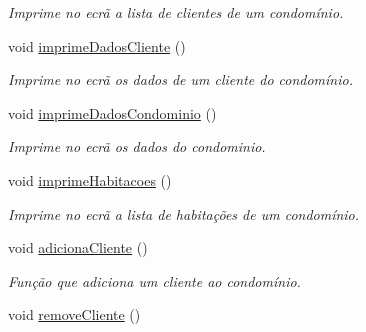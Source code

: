 \begin{DoxyCompactItemize}
\begin{DoxyCompactList}\small\item\em Imprime no ecrã a lista de clientes de um condomínio. \end{DoxyCompactList}\item 
void \hyperlink{class_interface_ad534a51f3ad3d4127764dfeb8ec6889c}{imprime\+Dados\+Cliente} ()\hypertarget{class_interface_ad534a51f3ad3d4127764dfeb8ec6889c}{}\label{class_interface_ad534a51f3ad3d4127764dfeb8ec6889c}

\begin{DoxyCompactList}\small\item\em Imprime no ecrã os dados de um cliente do condomínio. \end{DoxyCompactList}\item 
void \hyperlink{class_interface_aed67f4ad69432e696dee93694029fb2e}{imprime\+Dados\+Condominio} ()\hypertarget{class_interface_aed67f4ad69432e696dee93694029fb2e}{}\label{class_interface_aed67f4ad69432e696dee93694029fb2e}

\begin{DoxyCompactList}\small\item\em Imprime no ecrã os dados do condominio. \end{DoxyCompactList}\item 
void \hyperlink{class_interface_a45714f2fad37ed40fa88432d3c2cf26f}{imprime\+Habitacoes} ()\hypertarget{class_interface_a45714f2fad37ed40fa88432d3c2cf26f}{}\label{class_interface_a45714f2fad37ed40fa88432d3c2cf26f}

\begin{DoxyCompactList}\small\item\em Imprime no ecrã a lista de habitações de um condomínio. \end{DoxyCompactList}\item 
void \hyperlink{class_interface_af3b831e11a69de725ed8454e03b41b18}{adiciona\+Cliente} ()\hypertarget{class_interface_af3b831e11a69de725ed8454e03b41b18}{}\label{class_interface_af3b831e11a69de725ed8454e03b41b18}

\begin{DoxyCompactList}\small\item\em Função que adiciona um cliente ao condomínio. \end{DoxyCompactList}\item 
void \hyperlink{class_interface_a7c65a253d09316fd93ca81d1a2e8587a}{remove\+Cliente} ()\hypertarget{class_interface_a7c65a253d09316fd93ca81d1a2e8587a}{}\label{class_interface_a7c65a253d09316fd93ca81d1a2e8587a}


\end{DoxyCompactItemize}
